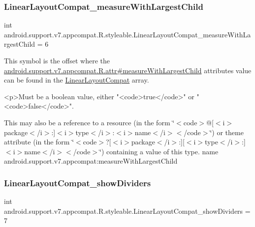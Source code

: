 \subsubsection{\texorpdfstring{Linear\+Layout\+Compat\+\_\+measure\+With\+Largest\+Child}{LinearLayoutCompat\_measureWithLargestChild}}
{\footnotesize\ttfamily int android.\+support.\+v7.\+appcompat.\+R.\+styleable.\+Linear\+Layout\+Compat\+\_\+measure\+With\+Largest\+Child = 6\hspace{0.3cm}{\ttfamily [static]}}

This symbol is the offset where the \hyperlink{classandroid_1_1support_1_1v7_1_1appcompat_1_1R_1_1attr_a57b891f80593796c5cba8f35567f332c}{android.\+support.\+v7.\+appcompat.\+R.\+attr\#measure\+With\+Largest\+Child} attribute\textquotesingle{}s value can be found in the \hyperlink{classandroid_1_1support_1_1v7_1_1appcompat_1_1R_1_1styleable_a765d32873526b8c36de14b184094582d}{Linear\+Layout\+Compat} array.

\begin{DoxyVerb}      <p>Must be a boolean value, either "<code>true</code>" or "<code>false</code>".
\end{DoxyVerb}
 

This may also be a reference to a resource (in the form \char`\"{}$<$code$>$@\mbox{[}$<$i$>$package$<$/i$>$\+:\mbox{]}$<$i$>$type$<$/i$>$\+:$<$i$>$name$<$/i$>$$<$/code$>$\char`\"{}) or theme attribute (in the form \char`\"{}$<$code$>$?\mbox{[}$<$i$>$package$<$/i$>$\+:\mbox{]}\mbox{[}$<$i$>$type$<$/i$>$\+:\mbox{]}$<$i$>$name$<$/i$>$$<$/code$>$\char`\"{}) containing a value of this type.  name android.\+support.\+v7.\+appcompat\+:measure\+With\+Largest\+Child \mbox{\label{classandroid_1_1support_1_1v7_1_1appcompat_1_1R_1_1styleable_a18ec21806877ae05158a519df038e895}} 
\subsubsection{\texorpdfstring{Linear\+Layout\+Compat\+\_\+show\+Dividers}{LinearLayoutCompat\_showDividers}}
{\footnotesize\ttfamily int android.\+support.\+v7.\+appcompat.\+R.\+styleable.\+Linear\+Layout\+Compat\+\_\+show\+Dividers = 7\hspace{0.3cm}{\ttfamily [static]}}

